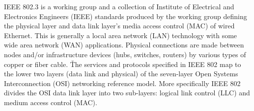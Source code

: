 IEEE 802.3 is a working group and a collection of Institute of Electrical and Electronics Engineers (IEEE) standards
produced by the working group defining the physical layer and data link layer's media access control (MAC) of wired
Ethernet. This is generally a local area network (LAN) technology with some wide area network (WAN) applications.
Physical connections are made between nodes and/or infrastructure devices (hubs, switches, routers) by various types
of copper or fiber cable. \v

The services and protocols specified in IEEE 802 map to the lower two layers (data link and physical) of the
seven-layer Open Systems Interconnection (OSI) networking reference model. More specifically IEEE 802 divides the OSI
data link layer into two sub-layers: logical link control (LLC) and medium access control (MAC).